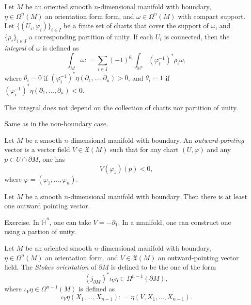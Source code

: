 \documentclass{ximera}
\begin{document}
\begin{definition}
Let $M$ be an oriented smooth $n$-dimensional manifold with boundary,  $\eta \in \Omega ^n (M)$ an orientation form form, and $\omega \in \Omega ^n (M)$ with compact support. Let $\{ ( U_i , \varphi _i )  \}_{i \in I}$ be a finite set of charts that cover the support of $\omega$, and $\{ \rho _i \} _{i \in I}$ a corresponding partition of unity.  If each $U_i$ is connected, then the \emph{integral} of $\omega$ is defined as 
\[   \int_M \omega : = \sum _{i \in I} (-1) ^{\theta _i} \int_{\mathbb{H}^n}  (\varphi ^{-1}_i) ^{\ast} \rho _i \omega     ,  \]
where $\theta _i = 0 $ if $(\varphi_i^{-1} ) ^{\ast} \eta (\partial _1, \ldots , \partial _n ) > 0 $, and $\theta _i = 1 $ if $(\varphi_i^{-1} ) ^{\ast} \eta (\partial _1, \ldots , \partial _n ) < 0 $.
\end{definition}

\begin{proposition}
    The integral does not depend on the collection of charts nor partition of unity.
\end{proposition}

\begin{solution}
    Same as in the non-boundary case. 
\end{solution}



\begin{definition}
    Let $M$ be a smooth $n$-dimensional   manifold with boundary. An \emph{outward-pointing} vector is a vector field $V \in \mathfrak{X}(M)$ such that for any chart $(U , \varphi)$ and any $p \in U \cap \partial M$, one has
    \[      V ( \varphi_1 ) (p )  < 0  ,              \]
    where $\varphi = (\varphi _1, \ldots , \varphi _n)$. 
\end{definition}


\begin{proposition}
    Let $M$ be a smooth $n$-dimensional   manifold with boundary. Then there is at least one outward pointing vector.
\end{proposition}

\begin{solution}
   Exercise.    In $\overline{\mathbb{H}}^n$, one can take $V = - \partial _1$. In a manifold, one can construct one using a partion of unity. 
\end{solution}


\begin{definition}
    Let $M$ be an oriented smooth $n$-dimensional manifold with boundary, $\eta \in \Omega ^n (M) $ an orientation form, and $V \in \mathfrak{X}(M)$ an outward-pointing vector field. The \emph{Stokes orientation} of $\partial M$ is defined to be the one of the form 
    \[   ( j_{\partial M} ) ^{\ast} \iota _V \eta    \in \Omega ^{n-1} (\partial M),                 \]
    where  $\iota _V \eta \in \Omega ^{n-1} (M)$ is defined as
    \[   \iota _V \eta (X_1, \ldots , X_{n-1}) : = \eta (V, X_1, \ldots , X_{n-1})  .            \]
\end{definition}
\end{document}
